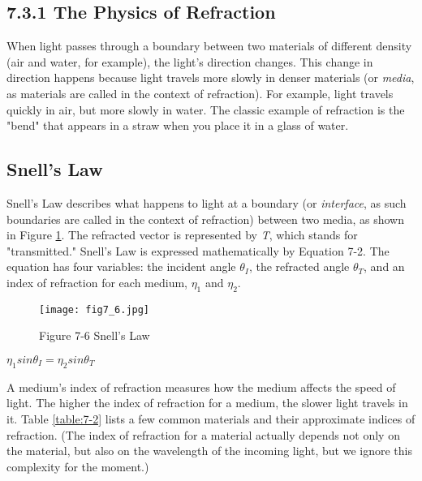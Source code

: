 \documentclass[../main.tex]{subfiles}
\begin{document}
\subsection{7.3.1 The Physics of Refraction}

When light passes through a boundary between two materials of different density (air and water, for example), the light's direction changes. This change in direction happens because light travels more slowly in denser materials (or \textit{media}, as materials are called in the context of refraction). For example, light travels quickly in air, but more slowly in water. The classic example of refraction is the "bend" that appears in a straw when you place it in a glass of water.

\subsection*{Snell's Law}

Snell's Law describes what happens to light at a boundary (or \textit{interface}, as such boundaries are called in the context of refraction) between two media, as shown in Figure \ref{fig:7-6}. The refracted vector is represented by \textit{T}, which stands for "transmitted." Snell's Law is expressed mathematically by Equation 7-2. The equation has four variables: the incident angle $\theta_I$, the refracted angle $\theta_T $, and an index of refraction for each medium, $\eta_1$ and $\eta_2$.

\begin{figure}
    \centering
    \texttt{[image: fig7\_6.jpg]}
    \caption{Figure 7-6 Snell's Law}
    \label{fig:7-6}
\end{figure}

\FloatBarrier
\begin{equationcaption}
$
\eta_1sin\theta_I=\eta_2sin\theta_T
$
\caption{Equation 7-2 Snell's Law}
\end{equationcaption}
\FloatBarrier

A medium's index of refraction measures how the medium affects the speed of light. The higher the index of refraction for a medium, the slower light travels in it. Table \ref{table:7-2} lists a few common materials and their approximate indices of refraction. (The index of refraction for a material actually depends not only on the material, but also on the wavelength of the incoming light, but we ignore this complexity for the moment.)
\end{document}
